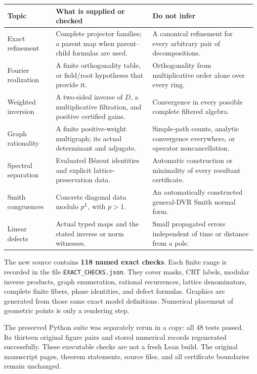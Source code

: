 {\small
\begin{tabularx}{\linewidth}{@{}p{.28\linewidth}YY@{}}\toprule
\textbf{Topic} & \textbf{What is supplied or checked} & \textbf{Do not infer}\\\midrule
Exact refinement & Complete projector families; a parent map when parent--child formulas are used. & A canonical refinement for every arbitrary pair of decompositions.\\
Fourier realization & A finite orthogonality table, or field/root hypotheses that provide it. & Orthogonality from multiplicative order alone over every ring.\\
Weighted inversion & A two-sided inverse of $D$, a multiplicative filtration, and positive certified gains. & Convergence in every possible complete filtered algebra.\\
Graph rationality & A finite positive-weight multigraph; its actual determinant and adjugate. & Simple-path counts, analytic convergence everywhere, or operator noncancellation.\\
Spectral separation & Evaluated B\'ezout identities and explicit lattice-preservation data. & Automatic construction or minimality of every resultant certificate.\\
Smith congruences & Concrete diagonal data modulo $p^L$, with $p>1$. & An automatically constructed general-DVR Smith normal form.\\
Linear defects & Actual typed maps and the stated inverse or norm witnesses. & Small propagated errors independent of time or distance from a pole.\\\bottomrule
\end{tabularx}}

The new source contains \textbf{118 named exact checks}. Each finite range is recorded in the file \texttt{EXACT\_CHECKS.json}. They cover masks, CRT labels, modular inverse products, graph enumeration, rational recurrences, lattice denominators, complete finite fibers, phase identities, and defect formulas. Graphics are generated from those same exact model definitions. Numerical placement of geometric points is only a rendering step.

The preserved Python suite was separately rerun in a copy: all 48 tests passed. Its thirteen original figure pairs and stored numerical records regenerated successfully. These executable checks are not a fresh Lean build. The original manuscript pages, theorem statements, source files, and all certificate boundaries remain unchanged.

